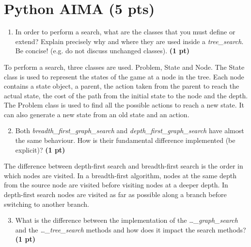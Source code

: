\documentclass[11pt,a4paper]{report}
\begin{document}
\maketitle

\section{Python AIMA (5 pts)}

\begin{enumerate}
  \item In order to perform a search, what are the classes that you must define or extend? Explain precisely why and where they are used inside a \textit{tree\_search}. Be concise! (e.g. do not discuss unchanged classes). \textbf{(1 pt)}
\end{enumerate}

\begin{answer}
To perform a search, three classes are used. Problem, State and Node. The State class is used to represent the states of the game at a node in the tree. Each node contains a state object, a parent, the action taken from the parent to reach the actual state, the cost of the path from the initial state to the node and the depth. 
The Problem class is used to find all the possible actions to reach a new state. It can also generate a new state from an old state and an action.

\end{answer}



\begin{enumerate}
\setcounter{enumi}{1}
    \item Both \textit{breadth\_first\_graph\_search} and \textit{depth\_first\_graph\_search} have almost the same behaviour. How is their fundamental difference implemented (be explicit)? \textbf{(1 pt)}
\end{enumerate}

\begin{answer}
The difference between depth-first search and breadth-first search is the order in which nodes are visited. In a breadth-first algorithm, nodes at the same depth from the source node are visited before visiting nodes at a deeper depth. In depth-first search nodes are visited as far as possible along a branch before switching to another branch.
\end{answer}



\begin{enumerate}
\setcounter{enumi}{2}
    \item What is the difference between the implementation of the \textit{\dots\_graph\_search} and the \textit{\dots\_tree\_search} methods and how does it impact the search methods? \textbf{(1 pt)}
\end{enumerate}
\end{document}
